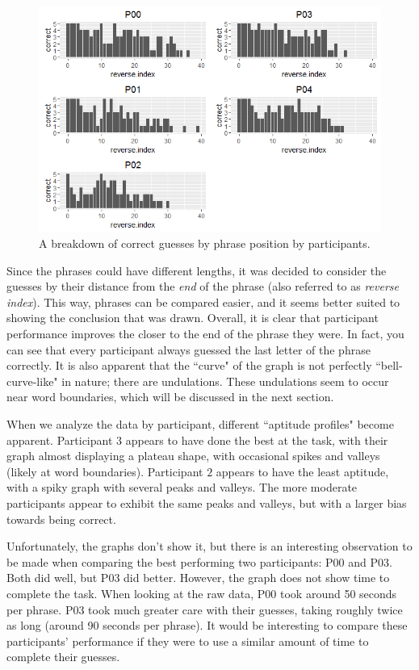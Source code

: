 \documentclass{article}
\begin{document}
\begin{figure}[h!]
\centering
\includegraphics[width=.65\linewidth]{participant-correct-by-phrase-position}
\caption{A breakdown of correct guesses by phrase position by participants.}
\label{fig:participant-correct-by-phrase-position}
\end{figure}

Since the phrases could have different lengths, it was decided to consider the guesses by their distance from the \emph{end} of the phrase (also referred to as \emph{reverse index}). This way, phrases can be compared easier, and it seems better suited to showing the conclusion that was drawn. Overall, it is clear that participant performance improves the closer to the end of the phrase they were. In fact, you can see that every participant always guessed the last letter of the phrase correctly. It is also apparent that the ``curve" of the graph is not perfectly ``bell-curve-like" in nature; there are undulations. These undulations seem to occur near word boundaries, which will be discussed in the next section.

When we analyze the data by participant, different ``aptitude profiles" become apparent. Participant $3$ appears to have done the best at the task, with their graph almost displaying a plateau shape, with occasional spikes and valleys (likely at word boundaries). Participant $2$ appears to have the least aptitude, with a spiky graph with several peaks and valleys. The more moderate participants appear to exhibit the same peaks and valleys, but with a larger bias towards being correct.

Unfortunately, the graphs don't show it, but there is an interesting observation to be made when comparing the best performing two participants: P00 and P03. Both did well, but P03 did better. However, the graph does not show time to complete the task. When looking at the raw data, P00 took around 50 seconds per phrase. P03 took much greater care with their guesses, taking roughly twice as long (around 90 seconds per phrase). It would be interesting to compare these participants' performance if they were to use a similar amount of time to complete their guesses.
\end{document}
